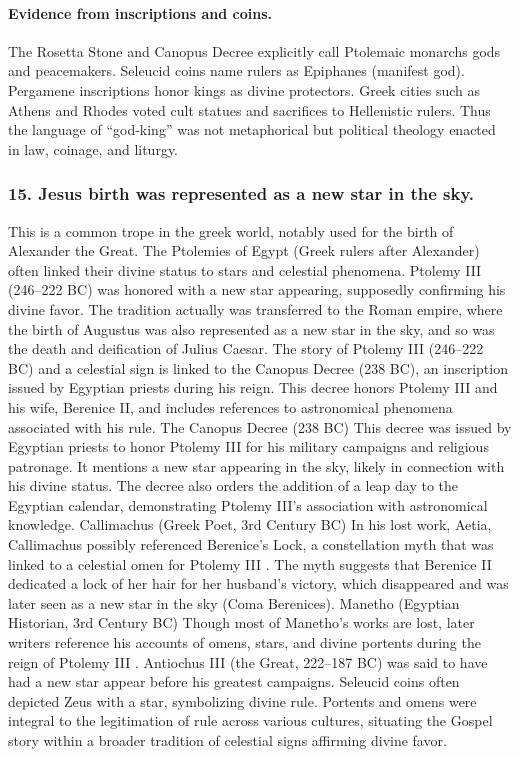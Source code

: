 \paragraph{Evidence from inscriptions and coins.}
The Rosetta Stone and Canopus Decree explicitly call Ptolemaic monarchs gods and peacemakers.
Seleucid coins name rulers as Epiphanes (manifest god).
Pergamene inscriptions honor kings as divine protectors.
Greek cities such as Athens and Rhodes voted cult statues and sacrifices to Hellenistic rulers.
Thus the language of “god-king” was not metaphorical but political theology enacted in law, coinage, and liturgy.

\subsubsection{15.
Jesus birth was represented as a new star in the sky.}\label{subsubsec:jesus-birth-was-represented-as-a-new-star-in-the-sky.}
This is a common trope in the greek world, notably used for the birth of Alexander the Great.
The Ptolemies of Egypt (Greek rulers after Alexander) often linked their divine status to stars and celestial phenomena.
Ptolemy III (246–222 BC) was honored with a new star appearing, supposedly confirming his divine favor.
The tradition actually was transferred to the Roman empire, where the birth of Augustus was also represented as a new star in the sky, and so was the death and deification of Julius Caesar.
The story of Ptolemy III (246–222 BC) and a celestial sign is linked to the Canopus Decree (238 BC), an inscription issued by Egyptian priests during his reign.
This decree honors Ptolemy III and his wife, Berenice II, and includes references to astronomical phenomena associated with his rule.
The Canopus Decree (238 BC) This decree was issued by Egyptian priests to honor Ptolemy III for his military campaigns and religious patronage.
It mentions a new star appearing in the sky, likely in connection with his divine status.
The decree also orders the addition of a leap day to the Egyptian calendar, demonstrating Ptolemy III’s association with astronomical knowledge.
Callimachus (Greek Poet, 3rd Century BC) In his lost work, Aetia, Callimachus possibly referenced Berenice’s Lock, a constellation myth that was linked to a celestial omen for Ptolemy III .
The myth suggests that Berenice II dedicated a lock of her hair for her husband’s victory, which disappeared and was later seen as a new star in the sky (Coma Berenices).
Manetho (Egyptian Historian, 3rd Century BC) Though most of Manetho’s works are lost, later writers reference his accounts of omens, stars, and divine portents during the reign of Ptolemy III .
Antiochus III (the Great, 222–187 BC) was said to have had a new star appear before his greatest campaigns.
Seleucid coins often depicted Zeus with a star, symbolizing divine rule.
Portents and omens were integral to the legitimation of rule across various cultures, situating the Gospel story within a broader tradition of celestial signs affirming divine favor.

